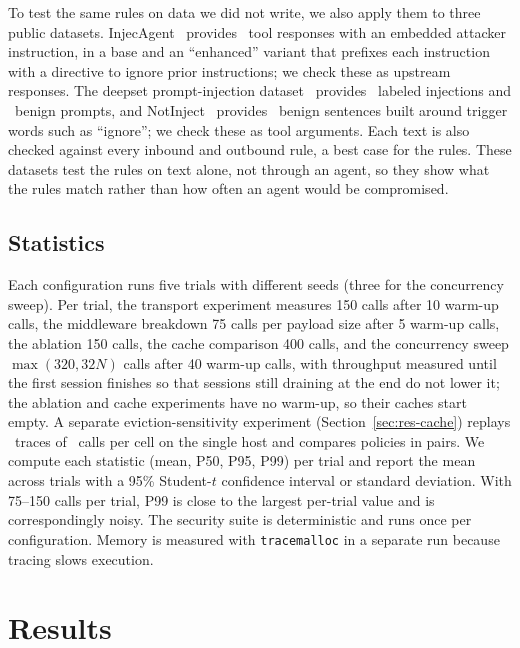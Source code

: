 \documentclass{ieeeaccess}
\begin{document}
To test the same rules on data we did not write, we also apply them to three public datasets. InjecAgent~\cite{zhan2024injecagent} provides \extIaBase\ tool responses with an embedded attacker instruction, in a base and an ``enhanced'' variant that prefixes each instruction with a directive to ignore prior instructions; we check these as upstream responses. The deepset prompt-injection dataset~\cite{deepset2023promptinjections} provides \extDsMal\ labeled injections and \extDsBen\ benign prompts, and NotInject~\cite{li2024injecguard} provides \extNiN\ benign sentences built around trigger words such as ``ignore''; we check these as tool arguments. Each text is also checked against every inbound and outbound rule, a best case for the rules. These datasets test the rules on text alone, not through an agent, so they show what the rules match rather than how often an agent would be compromised.

\subsection{Statistics}
Each configuration runs five trials with different seeds (three for the concurrency sweep). Per trial, the transport experiment measures 150 calls after 10 warm-up calls, the middleware breakdown 75 calls per payload size after 5 warm-up calls, the ablation 150 calls, the cache comparison 400 calls, and the concurrency sweep $\max(320, 32N)$ calls after 40 warm-up calls, with throughput measured until the first session finishes so that sessions still draining at the end do not lower it; the ablation and cache experiments have no warm-up, so their caches start empty. A separate eviction-sensitivity experiment (Section~\ref{sec:res-cache}) replays \senSeeds\ traces of \senTrace\ calls per cell on the single host and compares policies in pairs. We compute each statistic (mean, P50, P95, P99) per trial and report the mean across trials with a 95\% Student-$t$ confidence interval or standard deviation. With 75--150 calls per trial, P99 is close to the largest per-trial value and is correspondingly noisy. The security suite is deterministic and runs once per configuration. Memory is measured with \texttt{tracemalloc} in a separate run because tracing slows execution.

\section{Results}
\label{sec:results}
\end{document}
